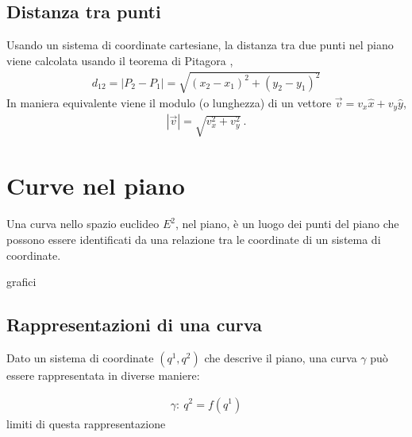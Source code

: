 \documentclass[letterpaper,10pt,english]{jupyterBook}
\begin{document}
\subsection{Distanza tra punti}
\label{\detokenize{ch/analytic_geometry/analytic_geometry_2d/points:distanza-tra-punti}}
\sphinxAtStartPar
Usando un sistema di coordinate cartesiane, la distanza tra due punti nel piano viene calcolata usando il teorema di Pitagora ,
\begin{equation*}
\begin{split}d_{12} = |P_2 - P_1| = \sqrt{(x_2 - x_1)^2 + (y_2 - y_1)^2}\end{split}
\end{equation*}
\sphinxAtStartPar
In maniera equivalente viene il modulo (o lunghezza) di un vettore \(\vec{v} = v_x \hat{x} + v_y \hat{y}\),
\begin{equation*}
\begin{split}|\vec{v}| = \sqrt{v_x^2 + v_y^2} \ .\end{split}
\end{equation*}


\sphinxstepscope


\section{Curve nel piano}
\label{\detokenize{ch/analytic_geometry/analytic_geometry_2d/curves:curve-nel-piano}}\label{\detokenize{ch/analytic_geometry/analytic_geometry_2d/curves:geometry-analytic-2d-curves}}\label{\detokenize{ch/analytic_geometry/analytic_geometry_2d/curves::doc}}
\sphinxAtStartPar
Una curva nello spazio euclideo \(E^2\), nel piano, è un luogo dei punti del piano che possono essere identificati da una relazione tra le coordinate di un sistema di coordinate.

\sphinxAtStartPar
{}  grafici




\subsection{Rappresentazioni di una curva}
\label{\detokenize{ch/analytic_geometry/analytic_geometry_2d/curves:rappresentazioni-di-una-curva}}
\sphinxAtStartPar
Dato un sistema di coordinate \((q^1, q^2)\) che descrive il piano, una curva \(\gamma\) può essere rappresentata in diverse maniere:

\sphinxAtStartPar
{}
\begin{equation*}
\begin{split}\gamma: \ q^2 = f(q^1)\end{split}
\end{equation*}
\sphinxAtStartPar
{} limiti di questa rappresentazione
\end{document}
